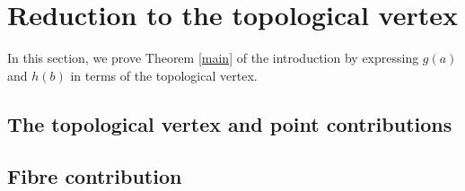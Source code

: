 \documentclass{amsart}
\theoremstyle{definition}
\begin{document}
   
\section{Reduction to the topological vertex}   

In this section, we prove Theorem \ref{main} of the introduction by expressing $g(a)$ and $h(b)$ in terms of the topological vertex. 

\subsection{The topological vertex and point contributions}   
   
\subsection{Fibre contribution}
\end{document}
